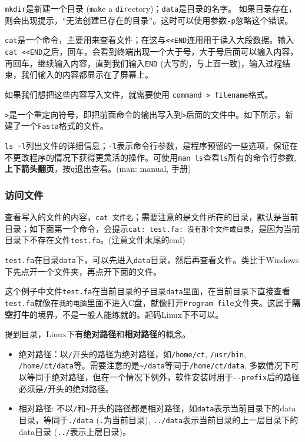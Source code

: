 \documentclass[]{article}
\numberwithin{figure}{section}
\numberwithin{table}{section}
\begin{document}
\texttt{mkdir}是新建一个目录 (\texttt{m}a\texttt{k}e a \texttt{dir}ectory)；\texttt{data}是目录的名字。
如果目录存在，则会出现提示，``无法创建已存在的目录''。这时可以使用参数\texttt{-p}忽略这个错误。

\texttt{cat}是一个命令，主要用来查看文件；在这与\texttt{\textless{}\textless{}END}连用用于读入大段数据。输入\texttt{cat\ \textless{}\textless{}END}之后，回车，会看到终端出现一个大于号，大于号后面可以输入内容，再回车，继续输入内容，直到我们输入\texttt{END} (大写的，与上面一致)，输入过程结束，我们输入的内容都显示在了屏幕上。

如果我们想把这些内容写入文件，就需要使用 \texttt{command\ \textgreater{}\ filename}格式。

\texttt{\textgreater{}}是一个重定向符号，即把前面命令的输出写入到\texttt{\textgreater{}}后面的文件中。如下所示，新建了一个\texttt{Fasta}格式的文件。

\texttt{ls\ -l}列出文件的详细信息；\texttt{-l}表示命令行参数，是程序预留的一些选项，保证在不更改程序的情况下获得更灵活的操作。可使用\texttt{man\ ls}查看\texttt{ls}所有的命令行参数, \textbf{上下箭头翻页}，按\texttt{q}退出查看。(man: manual, 手册)

\hypertarget{cat_file}{%
\subsubsection{访问文件}\label{cat_file}}

查看写入的文件的内容，\texttt{cat\ 文件名}；需要注意的是文件所在的目录，默认是当前目录；如下面第一个命令，会提示\texttt{cat:\ test.fa:\ 没有那个文件或目录}，是因为当前目录下不存在文件\texttt{test.fa}。(注意文件末尾的end)

\texttt{test.fa}在目录\texttt{data}下，可以先进入\texttt{data}目录，然后再查看文件。类比于Windows下先点开一个文件夹，再点开下面的文件。

这个例子中文件\texttt{test.fa}在当前目录的子目录\texttt{data}里面，在当前目录下直接查看\texttt{test.fa}就像在\texttt{我的电脑}里面不进入C盘，就像打开\texttt{Program\ file}文件夹。这属于\textbf{隔空打牛}的境界，不是一般人能练就的。起码Linux下不可以。

提到目录，Linux下有\textbf{绝对路径}和\textbf{相对路径}的概念。

\begin{itemize}
\item
  绝对路径：以\texttt{/}开头的路径为绝对路径，如\texttt{/home/ct}, \texttt{/usr/bin}, \texttt{/home/ct/data}等。需要注意的是\texttt{\textasciitilde{}/data}等同于\texttt{/home/ct/data}, 多数情况下可以等同于绝对路径，但在一个情况下例外，软件安装时用于\texttt{-\/-prefix}后的路径必须是\texttt{/}开头的绝对路径。
\item
  相对路径: 不以\texttt{/}和\texttt{\textasciitilde{}}开头的路径都是相对路径，如\texttt{data}表示当前目录下的data目录，等同于\texttt{./data} (\texttt{.}为当前目录), \texttt{../data}表示当前目录的上一层目录下的data目录 (\texttt{../}表示上层目录)。
\end{itemize}
\end{document}
